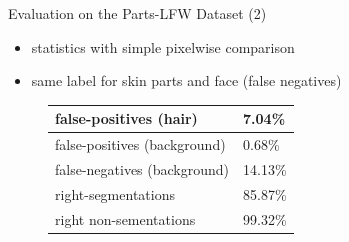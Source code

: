 \documentclass{beamer}
\begin{document}
\begin{frame}[c]{Evaluation on the Parts-LFW Dataset (2)}
	\begin{itemize}
		\item statistics with simple pixelwise comparison
		\item same label for skin parts and face (false negatives)
	\end{itemize}
		\centering
		\begin{figure}
			\begin{center}
				\begin{tabular}{l|l} \hline
					false-positives (hair) & 7.04\%\\ \hline
					false-positives (background) & 0.68\%\\ \hline
					false-negatives (background) & 14.13\%\\ \hline
					right-segmentations & 85.87\%\\ \hline
					right non-sementations & 99.32\% \\ \hline
				\end{tabular}
			\end{center}
		\end{figure}
\end{frame}
\end{document}
